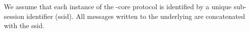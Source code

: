 \begin{remark}
	We assume that each instance of the \bidsettm-core protocol is identified by a unique sub-session identifier (ssid). All messages written to the underlying \podtm are concatenated with the ssid.
\end{remark}

